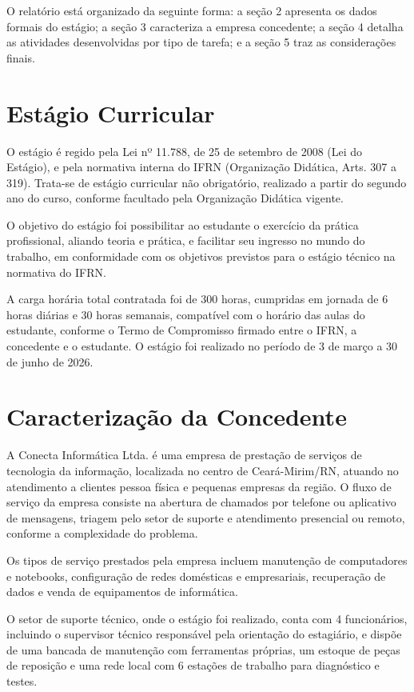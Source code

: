 \documentclass[article,12pt,a4paper,oneside]{abntex2}
\begin{document}
O relatório está organizado da seguinte forma: a seção 2 apresenta os
dados formais do estágio; a seção 3 caracteriza a empresa concedente; a
seção 4 detalha as atividades desenvolvidas por tipo de tarefa; e a seção
5 traz as considerações finais.

\section{Estágio Curricular}

O estágio é regido pela Lei nº 11.788, de 25 de setembro de 2008 (Lei do
Estágio), e pela normativa interna do IFRN (Organização Didática, Arts.
307 a 319). Trata-se de estágio curricular não obrigatório, realizado a
partir do segundo ano do curso, conforme facultado pela Organização
Didática vigente.

O objetivo do estágio foi possibilitar ao estudante o exercício da prática
profissional, aliando teoria e prática, e facilitar seu ingresso no mundo
do trabalho, em conformidade com os objetivos previstos para o estágio
técnico na normativa do IFRN.

A carga horária total contratada foi de 300 horas, cumpridas em jornada de
6 horas diárias e 30 horas semanais, compatível com o horário das aulas do
estudante, conforme o Termo de Compromisso firmado entre o IFRN, a
concedente e o estudante. O estágio foi realizado no período de 3 de
março a 30 de junho de 2026.

\section{Caracterização da Concedente}

A Conecta Informática Ltda. é uma empresa de prestação de serviços de
tecnologia da informação, localizada no centro de Ceará-Mirim/RN, atuando
no atendimento a clientes pessoa física e pequenas empresas da região. O
fluxo de serviço da empresa consiste na abertura de chamados por telefone
ou aplicativo de mensagens, triagem pelo setor de suporte e atendimento
presencial ou remoto, conforme a complexidade do problema.

Os tipos de serviço prestados pela empresa incluem manutenção de
computadores e notebooks, configuração de redes domésticas e empresariais,
recuperação de dados e venda de equipamentos de informática.

O setor de suporte técnico, onde o estágio foi realizado, conta com 4
funcionários, incluindo o supervisor técnico responsável pela orientação
do estagiário, e dispõe de uma bancada de manutenção com ferramentas
próprias, um estoque de peças de reposição e uma rede local com 6
estações de trabalho para diagnóstico e testes.
\end{document}
